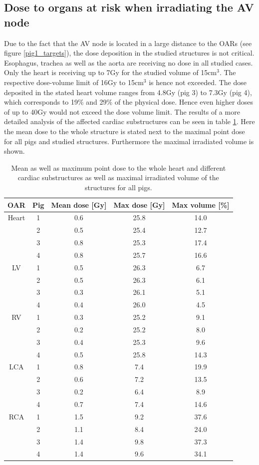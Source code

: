 \newpage


\subsection{Dose to organs at risk when irradiating the AV node}

Due to the fact that the AV node is located in a large distance to the OARs (see figure \ref{pig1_targets}), the dose deposition in the 
studied structures is not critical. Esophagus, trachea as well as the aorta are receiving no dose in all studied cases. 
Only the heart is receiving up to 7Gy for the studied volume of 15cm$^{3}$. The respective dose-volume limit of 16Gy to 15cm$^{3}$ is hence 
not exceeded.  The dose deposited in the stated heart volume ranges from 4.8Gy (pig 3) to 7.3Gy (pig 4), which corresponds to 19\% and 29\% of 
the physical dose. Hence even higher doses of up to 40Gy would not exceed the dose volume limit. 
The results of a more detailed analysis of the affected cardiac substructures can be seen in table \ref{DV_OAR:pig}. Here the mean dose to the 
whole structure is stated next to the maximal point dose for all pigs and studied structures. Furthermore the maximal irradiated volume 
is shown. 


\begin{table}[htbp]
\footnotesize
\centering
\caption{Mean as well as maximum point dose to the whole heart and different cardiac substructures as well as maximal irradiated 
volume of the structures for all pigs.}
  \begin{tabular}{ |c||c||c|c|c|}
    \hline
    OAR & Pig & Mean dose [Gy] & Max dose [Gy] & Max volume [\%] \\ \hline \hline
Heart & 1 & 0.6 & 25.8 & 14.0 \\ 
 & 2 & 0.5 & 25.4 & 12.7 \\ 
 & 3 & 0.8 & 25.3 & 17.4 \\ 
 & 4 & 0.8 & 25.7 & 16.6 \\ 
\hline
LV & 1 & 0.5 & 26.3 & 6.7 \\ 
 & 2 & 0.5 & 26.3 & 6.1 \\ 
 & 3 & 0.3 & 26.1 & 5.1 \\ 
 & 4 & 0.4 & 26.0 & 4.5 \\ 
\hline
RV & 1 & 0.3 & 25.2 & 9.1 \\ 
 & 2 & 0.2 & 25.2 & 8.0 \\ 
 & 3 & 0.4 & 25.3 & 9.6 \\ 
 & 4 & 0.5 & 25.8 & 14.3 \\ 
\hline
LCA & 1 & 0.8 & 7.4 & 19.9 \\ 
 & 2 & 0.6 & 7.2 & 13.5 \\ 
 & 3 & 0.2 & 6.4 & 8.9 \\ 
 & 4 & 0.7 & 7.4 & 14.6 \\ 
\hline
RCA & 1 & 1.5 & 9.2 & 37.6 \\ 
 & 2 & 1.1 & 8.4 & 24.0 \\ 
 & 3 & 1.4 & 9.8 & 37.3 \\ 
 & 4 & 1.4 & 9.6 & 34.1 \\ 
\hline
  \end{tabular}
  \label{DV_OAR:pig}
\end{table}

